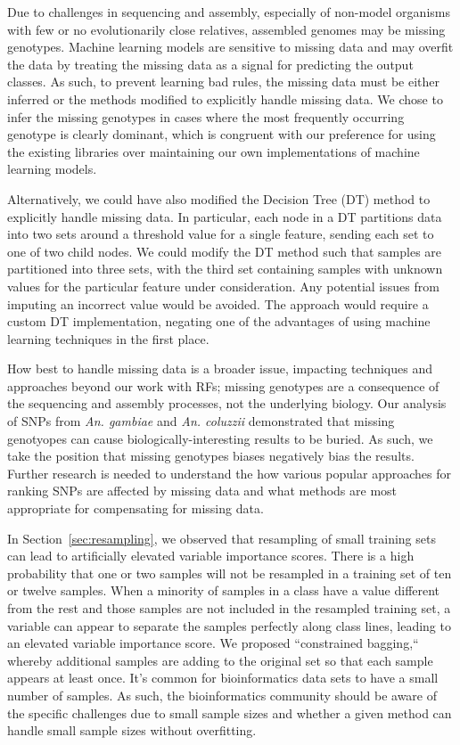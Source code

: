 Due to challenges in sequencing and assembly, especially of non-model organisms with few or no evolutionarily close relatives, assembled genomes may be missing genotypes.  Machine learning models are sensitive to missing data and may overfit the data by treating the missing data as a signal for predicting the output classes.  As such, to prevent learning bad rules, the missing data must be either inferred or the methods modified to explicitly handle missing data.  We chose to infer the missing genotypes in cases where the most frequently occurring genotype is clearly dominant, which is congruent with our preference for using the existing libraries over maintaining our own implementations of machine learning models.  

Alternatively, we could have also modified the Decision Tree (DT) method to explicitly handle missing data.  In particular, each node in a DT partitions data into two sets around a threshold value for a single feature, sending each set to one of two child nodes.  We could modify the DT method such that samples are partitioned into three sets, with the third set containing samples with unknown values for the particular feature under consideration.  Any potential issues from imputing an incorrect value would be avoided. The approach would require a custom DT implementation, negating one of the advantages of using machine learning techniques in the first place.

How best to handle missing data is a broader issue, impacting techniques and approaches beyond our work with RFs; missing genotypes are a consequence of the sequencing and assembly processes, not the underlying biology.  Our analysis of SNPs from \emph{An. gambiae} and \emph{An. coluzzii} demonstrated that missing genotyopes can cause biologically-interesting results to be buried.  As such, we take the position that missing genotypes biases negatively bias the results. Further research is needed to understand the how various popular approaches for ranking SNPs are affected by missing data and what methods are most appropriate for compensating for missing data.

In Section~\ref{sec:resampling}, we observed that resampling of small training sets can lead to artificially elevated variable importance scores. There is a high probability that one or two samples will not be resampled in a training set of ten or twelve samples.  When a minority of samples in a class have a value different from the rest and those samples are not included in the resampled training set, a variable can appear to separate the samples perfectly along class lines, leading to an elevated variable importance score.  We proposed ``constrained bagging,`` whereby additional samples are adding to the original set so that each sample appears at least once. It's common for bioinformatics data sets to have a small number of samples.  As such, the bioinformatics community should be aware of the specific challenges due to small sample sizes and whether a given method can handle small sample sizes without overfitting.

